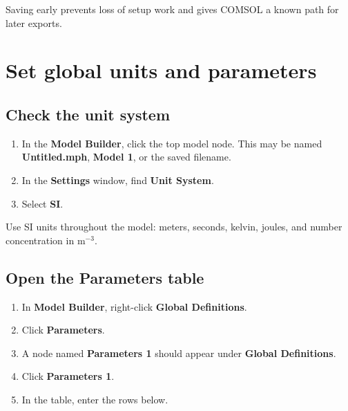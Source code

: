 \documentclass[11pt]{article}
\begin{document}
Saving early prevents loss of setup work and gives COMSOL a known path for later exports.

\section{Set global units and parameters}

\subsection{Check the unit system}

\begin{enumerate}[leftmargin=2em]
\item In the \textbf{Model Builder}, click the top model node. This may be named \textbf{Untitled.mph}, \textbf{Model 1}, or the saved filename.
\item In the \textbf{Settings} window, find \textbf{Unit System}.
\item Select \textbf{SI}.
\end{enumerate}

Use SI units throughout the model: meters, seconds, kelvin, joules, and number concentration in $\mathrm{m}^{-3}$.

\subsection{Open the Parameters table}

\begin{enumerate}[leftmargin=2em]
\item In \textbf{Model Builder}, right-click \textbf{Global Definitions}.
\item Click \textbf{Parameters}.
\item A node named \textbf{Parameters 1} should appear under \textbf{Global Definitions}.
\item Click \textbf{Parameters 1}.
\item In the table, enter the rows below.
\end{enumerate}
\end{document}

